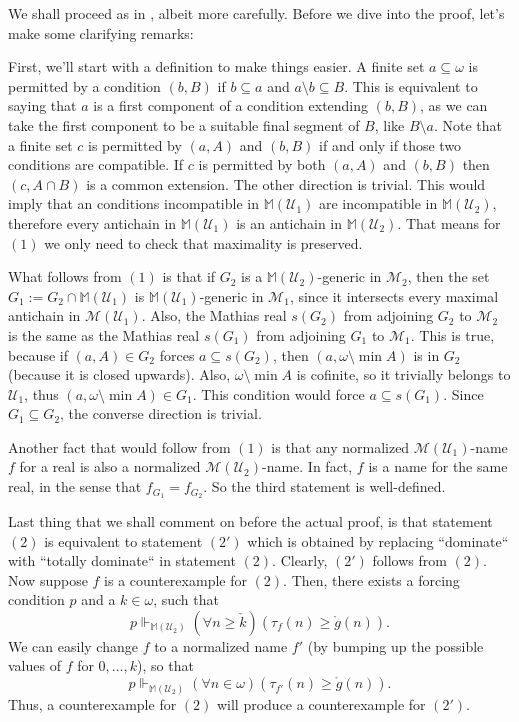 \documentclass[12pt]{article}\usepackage[english]{babel}
\newcommand{\M}{\mathbb{M}}
\newcommand{\calM}{\mathcal{M}}
\newcommand{\calU}{\mathcal{U}}
\theoremstyle{definition}
\theoremstyle{remark}
\begin{document}
We shall proceed as in \cite{BlassShelah1989}, albeit more carefully.
Before we dive into the proof, let's make some clarifying remarks:

First, we'll start with a definition to make things easier.
A finite set $a \subseteq \omega$ is permitted by a condition $(b, B)$ if $b \subseteq a$ and $a \setminus b \subseteq B$.
This is equivalent to saying that $a$ is a first component of a condition extending $(b, B)$, as we can take the first component to be a suitable final segment of $B$, like $B \setminus a$.
Note that a finite set $c$ is permitted by $(a, A)$ and $(b, B)$ if and only if those two conditions are compatible.
If $c$ is permitted by both $(a, A)$ and $(b, B)$ then $(c, A \cap B)$ is a common extension.
The other direction is trivial.
This would imply that an conditions incompatible in $\M(\calU_1)$ are incompatible in $\M(\calU_2)$, therefore every antichain in $\M(\calU_1)$ is an antichain in $\M(\calU_2)$.
That means for $(1)$ we only need to check that maximality is preserved.

What follows from $(1)$ is that if $G_2$ is a $\M(\calU_2)$-generic in $\calM_2$, then the set $G_1 := G_2 \cap \M(\calU_1)$ is $\M(\calU_1)$-generic in $\calM_1$, since it intersects every maximal antichain in $\calM(\calU_1)$.
Also, the Mathias real $s(G_2)$ from adjoining $G_2$ to $\calM_2$ is the same as the Mathias real $s(G_1)$ from adjoining $G_1$ to $\calM_1$.
This is true, because if $(a, A) \in G_2$ forces $a \subseteq s(G_2)$, then $(a, \omega \setminus \min A)$ is in $G_2$ (because it is closed upwards).
Also, $\omega \setminus \min A$ is cofinite, so it trivially belongs to $\calU_1$, thus $(a, \omega \setminus \min A) \in G_1$.
This condition would force $a \subseteq s(G_1)$.
Since $G_1 \subseteq G_2$, the converse direction is trivial.

Another fact that would follow from $(1)$ is that any normalized $\calM(\calU_1)$-name $f$ for a real is also a normalized $\calM(\calU_2)$-name.
In fact, $f$ is a name for the same real, in the sense that $f_{G_1} = f_{G_2}$.
So the third statement is well-defined.

Last thing that we shall comment on before the actual proof, is that statement $(2)$ is equivalent to statement $(2')$ which is obtained by replacing ``dominate`` with ``totally dominate`` in statement $(2)$.
Clearly, $(2')$ follows from $(2)$.
Now suppose $f$ is a counterexample for $(2)$.
Then, there exists a forcing condition $p$ and a $k \in \omega$, such that
\[
  p \Vdash_{\M(\calU_2)} (\forall n \geq \check{k})(\tau_f(n) \geq \mathring{g}(n)).
\]
We can easily change $f$ to a normalized name $f'$ (by bumping up the possible values of $f$ for $0, \dots, k$), so that
\[
  p \Vdash_{\M(\calU_2)} (\forall n \in \omega)(\tau_{f'}(n) \geq \mathring{g}(n)).
\]
Thus, a counterexample for $(2)$ will produce a counterexample for $(2')$.
\end{document}
